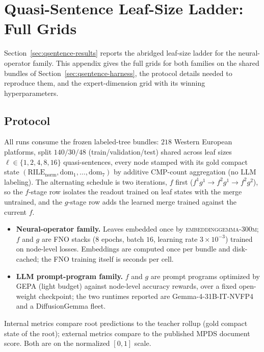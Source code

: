 \section{Quasi-Sentence Leaf-Size Ladder: Full Grids}\label{app:qsentence-leaf-ladder}

Section~\ref{sec:qsentence-results} reports the abridged leaf-size
ladder for the neural-operator family. This appendix gives the full
grids for both families on the shared bundles of
Section~\ref{sec:qsentence-harness}, the protocol details needed to
reproduce them, and the expert-dimension grid with its winning
hyperparameters.

\subsection{Protocol}

All runs consume the frozen labeled-tree bundles: $218$ Western
European platforms, split $140/30/48$ (train/validation/test) shared
across leaf sizes $\ell \in \{1,2,4,8,16\}$ quasi-sentences, every node
stamped with its gold compact state
$(\mathrm{RILE}_{\mathrm{norm}}, \mathrm{dom}_1,\dots,\mathrm{dom}_7)$
by additive CMP-count aggregation (no LLM labeling). The alternating
schedule is two iterations, $f$ first ($f^1g^1 \to f^2g^1 \to f^2g^2$),
so the $f$-stage row isolates the readout trained on leaf states with
the merge untrained, and the $g$-stage row adds the learned merge
trained against the current $f$.

\begin{itemize}[leftmargin=1.5em]
    \item \textbf{Neural-operator family.} Leaves embedded once by
          \textsc{embeddinggemma-300m}; $f$ and $g$ are FNO stacks
          ($8$ epochs, batch $16$, learning rate $3\times 10^{-3}$)
          trained on node-level losses. Embeddings are computed once
          per bundle and disk-cached; the FNO training itself is
          seconds per cell.
    \item \textbf{LLM prompt-program family.} $f$ and $g$ are prompt
          programs optimized by GEPA (light budget) against node-level
          accuracy rewards, over a fixed open-weight checkpoint; the
          two runtimes reported are Gemma-4-31B-IT-NVFP4 and a
          DiffusionGemma fleet.
\end{itemize}

Internal metrics compare root predictions to the teacher rollup (gold
compact state of the root); external metrics compare to the published
MPDS document score. Both are on the normalized $[0,1]$ scale.

